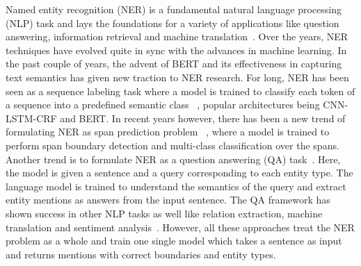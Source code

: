 Named entity recognition (NER) is a fundamental natural language processing (NLP) task and lays the foundations for a variety of applications like question answering, information retrieval and machine translation~\cite{li2020survey}. Over the years, NER techniques have evolved quite in sync with the advances in machine learning. In the past couple of years, the advent of BERT \cite{devlin2019bert} and its effectiveness in capturing text semantics has given new traction to NER research. For long, NER has been seen as a sequence labeling task where a model is trained to classify each token of a sequence into a predefined semantic class ~\cite{Chiu16,Lample16,ma2016end,devlin2019bert},
popular architectures being CNN-LSTM-CRF and BERT. In recent years however, there has been a new trend of formulating NER as span prediction problem ~\cite{li2020MRC,Jiang20,Ouchi20},
where a model is trained to perform span boundary detection and multi-class classification over the spans. Another trend is to formulate NER as a question answering (QA) task~\cite{li2020MRC}. Here, the model is given a sentence and a query corresponding to each entity type. The language model is trained to understand the semantics of the query and extract entity mentions as answers from the input sentence. %
The QA framework has shown success in other NLP tasks as well like relation extraction, machine translation and sentiment analysis~\cite{li2020MRC,levy2017zero,mccann2018natural}. However, all these approaches treat the NER problem as a whole and train one single model which takes a sentence as input and returns mentions with correct boundaries and entity types. 

